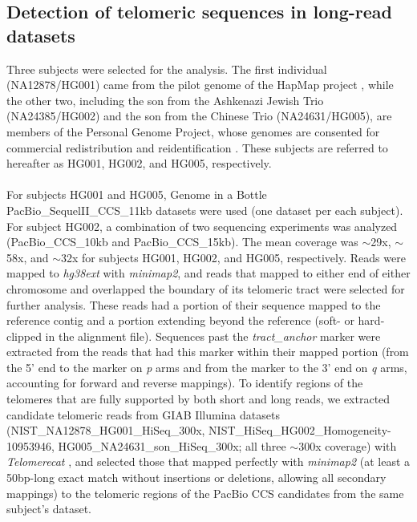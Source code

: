 \documentclass{article}
\begin{document}
\subsection*{Detection of telomeric sequences in long-read datasets}
Three subjects were selected for the analysis. %
The first individual (NA12878/HG001) came from the pilot genome of the HapMap project \cite{HG001}, while the other two, including the son from the Ashkenazi Jewish Trio (NA24385/HG002) and the son from the Chinese Trio (NA24631/HG005), are members of the Personal Genome Project, whose genomes are consented for commercial redistribution and reidentification \cite{HG00X}. %
These subjects are referred to hereafter as HG001, HG002, and HG005, respectively. %
\\~\\
For subjects HG001 and HG005, Genome in a Bottle \cite{giab} PacBio\_SequelII\_CCS\_11kb datasets were used (one dataset per each subject).
For subject HG002, a combination of two sequencing experiments was analyzed (PacBio\_CCS\_10kb and PacBio\_CCS\_15kb). %
The mean coverage was $\sim$29x, $\sim$58x, and $\sim$32x for subjects HG001, HG002, and HG005, respectively. %
Reads were mapped to \textit{hg38ext} with \textit{minimap2}, and reads that mapped to either end of either chromosome and overlapped the boundary of its telomeric tract were selected for further analysis. %
These reads had a portion of their sequence mapped to the reference contig and a portion extending beyond the reference (soft- or hard-clipped in the alignment file).
Sequences past the \textit{tract\_anchor} marker were extracted from the reads that had this marker within their mapped portion (from the 5' end to the marker on \textit{p} arms and from the marker to the 3' end on \textit{q} arms, accounting for forward and reverse mappings).
To identify regions of the telomeres that are fully supported by both short and long reads, we extracted candidate telomeric reads from GIAB Illumina datasets
   (NIST\_NA12878\_HG001\_HiSeq\_300x,
    NIST\_HiSeq\_HG002\_Homogeneity-10953946,
    HG005\_NA24631\_son\_HiSeq\_300x;
    all three $\sim$300x coverage)
with \textit{Telomerecat} \cite{telomerecat}, and selected those that mapped perfectly with \textit{minimap2} (at least a 50bp-long exact match without insertions or deletions, allowing all secondary mappings) to the telomeric regions of the PacBio CCS candidates from the same subject's dataset. %
\end{document}
